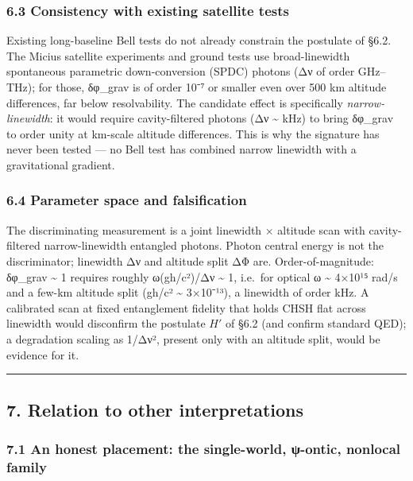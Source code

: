 \documentclass[
]{article}
\begin{document}
\subsubsection{6.3 Consistency with existing satellite
tests}\label{consistency-with-existing-satellite-tests}

Existing long-baseline Bell tests do not already constrain the postulate
of §6.2. The Micius satellite experiments and ground tests use
broad-linewidth spontaneous parametric down-conversion (SPDC) photons
(Δν of order GHz--THz); for those, δφ\_grav is of order 10⁻⁷ or smaller
even over 500 km altitude differences, far below resolvability. The
candidate effect is specifically \emph{narrow-linewidth}: it would
require cavity-filtered photons (Δν \textasciitilde{} kHz) to bring
δφ\_grav to order unity at km-scale altitude differences. This is why
the signature has never been tested --- no Bell test has combined narrow
linewidth with a gravitational gradient.

\subsubsection{6.4 Parameter space and
falsification}\label{parameter-space-and-falsification}

The discriminating measurement is a joint linewidth × altitude scan with
cavity-filtered narrow-linewidth entangled photons. Photon central
energy is not the discriminator; linewidth Δν and altitude split ΔΦ are.
Order-of-magnitude: δφ\_grav \textasciitilde{} 1 requires roughly
ω(gh/c²)/Δν \textasciitilde{} 1, i.e.~for optical ω \textasciitilde{}
4×10¹⁵ rad/s and a few-km altitude split (gh/c² \textasciitilde{}
3×10⁻¹³), a linewidth of order kHz. A calibrated scan at fixed
entanglement fidelity that holds CHSH flat across linewidth would
disconfirm the postulate \(H'\) of §6.2 (and confirm standard QED); a
degradation scaling as 1/Δν², present only with an altitude split, would
be evidence for it.

\begin{center}\rule{0.5\linewidth}{0.5pt}\end{center}

\subsection{7. Relation to other
interpretations}\label{relation-to-other-interpretations}

\subsubsection{7.1 An honest placement: the single-world, ψ-ontic,
nonlocal
family}\label{an-honest-placement-the-single-world-ux3c8-ontic-nonlocal-family}
\end{document}
